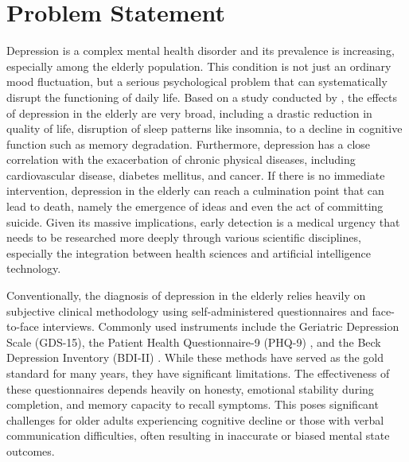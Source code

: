 \section{Problem Statement}
Depression is a complex mental health disorder and its prevalence is increasing, especially among the elderly population. This condition is not just an ordinary mood fluctuation, but a serious psychological problem that can systematically disrupt the functioning of daily life. Based on a study conducted by \cite{Devita2022}, the effects of depression in the elderly are very broad, including a drastic reduction in quality of life, disruption of sleep patterns like insomnia, to a decline in cognitive function such as memory degradation. Furthermore, depression has a close correlation with the exacerbation of chronic physical diseases, including cardiovascular disease, diabetes mellitus, and cancer. If there is no immediate intervention, depression in the elderly can reach a culmination point that can lead to death, namely the emergence of ideas and even the act of committing suicide. Given its massive implications, early detection is a medical urgency that needs to be researched more deeply through various scientific disciplines, especially the integration between health sciences and artificial intelligence technology.

Conventionally, the diagnosis of depression in the elderly relies heavily on subjective clinical methodology using self-administered questionnaires and face-to-face interviews. Commonly used instruments include the Geriatric Depression Scale (GDS-15), the Patient Health Questionnaire-9 (PHQ-9) \cite{Kroenke2001}, and the Beck Depression Inventory (BDI-II) \cite{Martin2010}. While these methods have served as the gold standard for many years, they have significant limitations. The effectiveness of these questionnaires depends heavily on honesty, emotional stability during completion, and memory capacity to recall symptoms. This poses significant challenges for older adults experiencing cognitive decline or those with verbal communication difficulties, often resulting in inaccurate or biased mental state outcomes.

